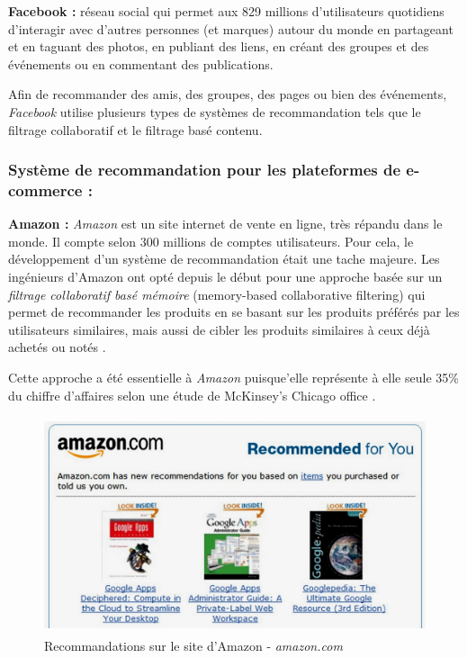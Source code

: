 \textbf{Facebook :} réseau social qui permet aux 829 millions d'utilisateurs quotidiens \cite{userFacebook} d'interagir avec d'autres personnes (et marques) autour du monde en partageant et en taguant des photos, en publiant des liens, en créant des groupes et des événements ou en commentant des publications. 

Afin de recommander des amis, des groupes, des pages ou bien des événements, \emph{Facebook} utilise plusieurs types de systèmes de recommandation tels que le filtrage collaboratif et le filtrage basé contenu.

\subsubsection{Système de recommandation pour les plateformes de e-commerce :}

\textbf{Amazon :} \emph{Amazon} est un site internet de vente en ligne, très répandu dans le monde. Il compte selon \cite{refamazonus} 300 millions de comptes utilisateurs. Pour cela, le développement d'un système de recommandation était une tache majeure. Les ingénieurs d'Amazon ont opté depuis le début pour une approche basée sur un \emph{filtrage collaboratif basé mémoire} (memory-based collaborative filtering) qui permet de recommander les produits en se basant sur les produits préférés par les utilisateurs similaires, mais aussi de cibler les produits similaires à ceux déjà achetés ou notés \cite{amazon}. 

Cette approche a été essentielle à \emph{Amazon} puisque'elle représente à elle seule 35\% du chiffre d'affaires selon une étude de McKinsey's Chicago office \cite{McKinsey}.
\begin{figure}[H]
    \centering
    \includegraphics[height=180pt,width=350pt]{img/chapter1/amazon.jpg}
    \caption{Recommandations sur le site d'Amazon - \emph{amazon.com}}
\end{figure}

